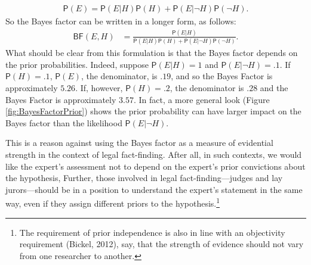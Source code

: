 \documentclass[
  10pt,
  dvipsnames,enabledeprecatedfontcommands]{scrartcl}
\newcommand{\n}{\neg}
\newcommand{\pr}[1]{\mathsf{P}(#1)}
\begin{document}
\begin{align} \label{eq:lotpSimple}
\pr{E}= \pr{E \vert H} \pr{H}+\pr{E \vert \neg H} \pr{\neg H}.
\end{align} \noindent  So the Bayes factor can be written in a longer
form, as follows: \begin{align}\label{eq:BFlotp}
\mathsf{BF}(E,H) & = \frac{\pr{E \vert H}}{\pr{E \vert H} \pr{H}+\pr{E \vert \neg H} \pr{\neg H}}.
\end{align} \noindent What should be clear from this formulation is that
the Bayes factor depends on the prior probabilities. Indeed, suppose
\(\pr{E \vert H} = 1\) and \(\pr{E \vert \neg H} = .1\). If
\(\pr{H}=.1\), \(\pr{E}\), the denominator, is \(.19\), and so the Bayes
Factor is approximately \(5.26\). If, however, \(\pr{H} =.2\), the
denominator is \(.28\) and the Bayes Factor is approximately \(3.57\).
In fact, a more general look (Figure \ref{fig:BayesFactorPrior}) shows
the prior probability can have larger impact on the Bayes factor than
the likelihood \(\pr{E \vert \n H}\).

This is a reason against using the Bayes factor as a measure of
evidential strength in the context of legal fact-finding. After all, in
such contexts, we would like the expert's assessment not to depend on
the expert's prior convictions about the hypothesis, Further, those
involved in legal fact-finding---judges and lay jurors---should be in a
position to understand the expert's statement in the same way, even if
they assign different priors to the hypothesis.\footnote{The requirement
  of prior independence is also in line with an objectivity requirement
  (Bickel, 2012), say, that the strength of evidence should not vary
  from one researcher to another.}

\footnotesize

\normalsize
\end{document}
